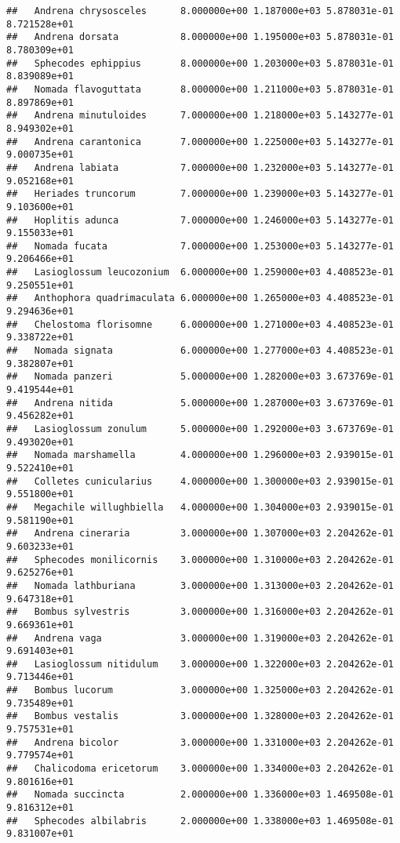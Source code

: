 \documentclass[
]{article}
\begin{document}
\begin{verbatim}
##   Andrena chrysosceles      8.000000e+00 1.187000e+03 5.878031e-01 8.721528e+01
##   Andrena dorsata           8.000000e+00 1.195000e+03 5.878031e-01 8.780309e+01
##   Sphecodes ephippius       8.000000e+00 1.203000e+03 5.878031e-01 8.839089e+01
##   Nomada flavoguttata       8.000000e+00 1.211000e+03 5.878031e-01 8.897869e+01
##   Andrena minutuloides      7.000000e+00 1.218000e+03 5.143277e-01 8.949302e+01
##   Andrena carantonica       7.000000e+00 1.225000e+03 5.143277e-01 9.000735e+01
##   Andrena labiata           7.000000e+00 1.232000e+03 5.143277e-01 9.052168e+01
##   Heriades truncorum        7.000000e+00 1.239000e+03 5.143277e-01 9.103600e+01
##   Hoplitis adunca           7.000000e+00 1.246000e+03 5.143277e-01 9.155033e+01
##   Nomada fucata             7.000000e+00 1.253000e+03 5.143277e-01 9.206466e+01
##   Lasioglossum leucozonium  6.000000e+00 1.259000e+03 4.408523e-01 9.250551e+01
##   Anthophora quadrimaculata 6.000000e+00 1.265000e+03 4.408523e-01 9.294636e+01
##   Chelostoma florisomne     6.000000e+00 1.271000e+03 4.408523e-01 9.338722e+01
##   Nomada signata            6.000000e+00 1.277000e+03 4.408523e-01 9.382807e+01
##   Nomada panzeri            5.000000e+00 1.282000e+03 3.673769e-01 9.419544e+01
##   Andrena nitida            5.000000e+00 1.287000e+03 3.673769e-01 9.456282e+01
##   Lasioglossum zonulum      5.000000e+00 1.292000e+03 3.673769e-01 9.493020e+01
##   Nomada marshamella        4.000000e+00 1.296000e+03 2.939015e-01 9.522410e+01
##   Colletes cunicularius     4.000000e+00 1.300000e+03 2.939015e-01 9.551800e+01
##   Megachile willughbiella   4.000000e+00 1.304000e+03 2.939015e-01 9.581190e+01
##   Andrena cineraria         3.000000e+00 1.307000e+03 2.204262e-01 9.603233e+01
##   Sphecodes monilicornis    3.000000e+00 1.310000e+03 2.204262e-01 9.625276e+01
##   Nomada lathburiana        3.000000e+00 1.313000e+03 2.204262e-01 9.647318e+01
##   Bombus sylvestris         3.000000e+00 1.316000e+03 2.204262e-01 9.669361e+01
##   Andrena vaga              3.000000e+00 1.319000e+03 2.204262e-01 9.691403e+01
##   Lasioglossum nitidulum    3.000000e+00 1.322000e+03 2.204262e-01 9.713446e+01
##   Bombus lucorum            3.000000e+00 1.325000e+03 2.204262e-01 9.735489e+01
##   Bombus vestalis           3.000000e+00 1.328000e+03 2.204262e-01 9.757531e+01
##   Andrena bicolor           3.000000e+00 1.331000e+03 2.204262e-01 9.779574e+01
##   Chalicodoma ericetorum    3.000000e+00 1.334000e+03 2.204262e-01 9.801616e+01
##   Nomada succincta          2.000000e+00 1.336000e+03 1.469508e-01 9.816312e+01
##   Sphecodes albilabris      2.000000e+00 1.338000e+03 1.469508e-01 9.831007e+01

\end{verbatim}
\end{document}
